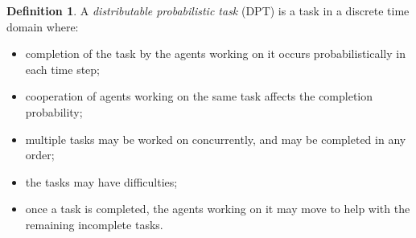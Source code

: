 \documentclass[11pt]{article}
\theoremstyle{definition}
\newtheorem{defn}{Definition}
\begin{document}
\begin{defn}
    A \emph{distributable probabilistic task} (DPT) is a task in a discrete
    time domain where:
    \begin{itemize}
        \item
            completion of the task by the agents working on it occurs
            probabilistically in each time step;
        \item
            cooperation of agents working on the same task affects the
            completion probability;
        \item
            multiple tasks may be worked on concurrently, and may be completed
            in any order;
        \item
            the tasks may have difficulties;
        \item
            once a task is completed, the agents working on it may move to help
            with the remaining incomplete tasks.
    \end{itemize}
\end{defn}
\end{document}
